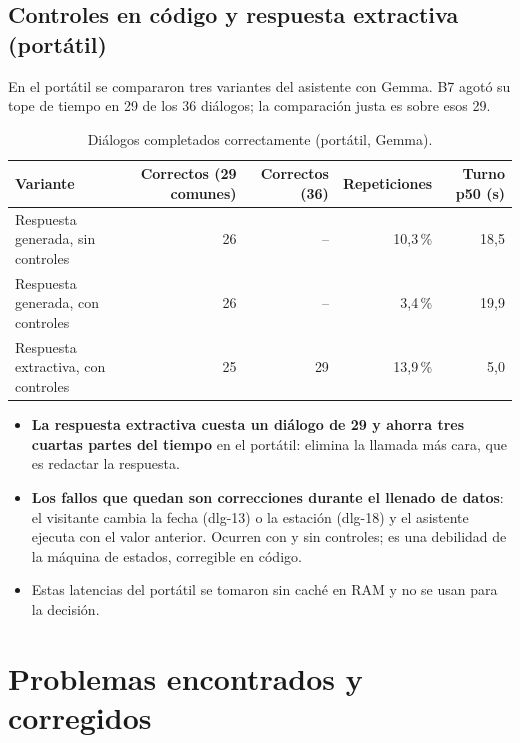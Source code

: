 \documentclass[11pt,a4paper]{article}
\newcommand{\nd}{\textcolor{muted}{--}}
\begin{document}
\subsection{Controles en código y respuesta extractiva (portátil)}

En el portátil se compararon tres variantes del asistente con Gemma. B7 agotó su tope de tiempo en 29 de los 36 diálogos; la comparación justa es sobre esos 29.

\begin{table}[H]
\centering\small
\caption{Diálogos completados correctamente (portátil, Gemma).}\label{tab:arms}
\begin{tabularx}{\textwidth}{@{}lRRRR@{}}
\toprule
Variante & Correctos (29 comunes) & Correctos (36) & Repeticiones & Turno p50 (s)\\
\midrule
Respuesta generada, sin controles & 26 & \nd & 10,3\,\% & 18,5\\
Respuesta generada, con controles & 26 & \nd & 3,4\,\% & 19,9\\
Respuesta extractiva, con controles & 25 & 29 & 13,9\,\% & 5,0\\
\bottomrule
\end{tabularx}
\end{table}

\begin{itemize}
\item \textbf{La respuesta extractiva cuesta un diálogo de 29 y ahorra tres cuartas partes del tiempo} en el portátil: elimina la llamada más cara, que es redactar la respuesta.
\item \textbf{Los fallos que quedan son correcciones durante el llenado de datos}: el visitante cambia la fecha (dlg-13) o la estación (dlg-18) y el asistente ejecuta con el valor anterior. Ocurren con y sin controles; es una debilidad de la máquina de estados, corregible en código.
\item Estas latencias del portátil se tomaron sin caché en RAM y no se usan para la decisión.
\end{itemize}

\section{Problemas encontrados y corregidos}\label{sec:fixes}
\end{document}
